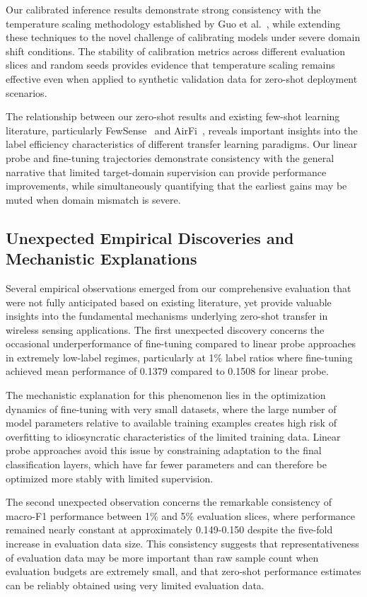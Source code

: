 \documentclass[journal]{IEEEtran}
\begin{document}
Our calibrated inference results demonstrate strong consistency with the temperature scaling methodology established by Guo et al.~\cite{calibration_guo2017}, while extending these techniques to the novel challenge of calibrating models under severe domain shift conditions. The stability of calibration metrics across different evaluation slices and random seeds provides evidence that temperature scaling remains effective even when applied to synthetic validation data for zero-shot deployment scenarios.

The relationship between our zero-shot results and existing few-shot learning literature, particularly FewSense~\cite{fewsense2022} and AirFi~\cite{airfi2022}, reveals important insights into the label efficiency characteristics of different transfer learning paradigms. Our linear probe and fine-tuning trajectories demonstrate consistency with the general narrative that limited target-domain supervision can provide performance improvements, while simultaneously quantifying that the earliest gains may be muted when domain mismatch is severe.

\subsection{Unexpected Empirical Discoveries and Mechanistic Explanations}

Several empirical observations emerged from our comprehensive evaluation that were not fully anticipated based on existing literature, yet provide valuable insights into the fundamental mechanisms underlying zero-shot transfer in wireless sensing applications. The first unexpected discovery concerns the occasional underperformance of fine-tuning compared to linear probe approaches in extremely low-label regimes, particularly at 1\% label ratios where fine-tuning achieved mean performance of 0.1379 compared to 0.1508 for linear probe.

The mechanistic explanation for this phenomenon lies in the optimization dynamics of fine-tuning with very small datasets, where the large number of model parameters relative to available training examples creates high risk of overfitting to idiosyncratic characteristics of the limited training data. Linear probe approaches avoid this issue by constraining adaptation to the final classification layers, which have far fewer parameters and can therefore be optimized more stably with limited supervision.

The second unexpected observation concerns the remarkable consistency of macro-F1 performance between 1\% and 5\% evaluation slices, where performance remained nearly constant at approximately 0.149-0.150 despite the five-fold increase in evaluation data size. This consistency suggests that representativeness of evaluation data may be more important than raw sample count when evaluation budgets are extremely small, and that zero-shot performance estimates can be reliably obtained using very limited evaluation data.
\end{document}
